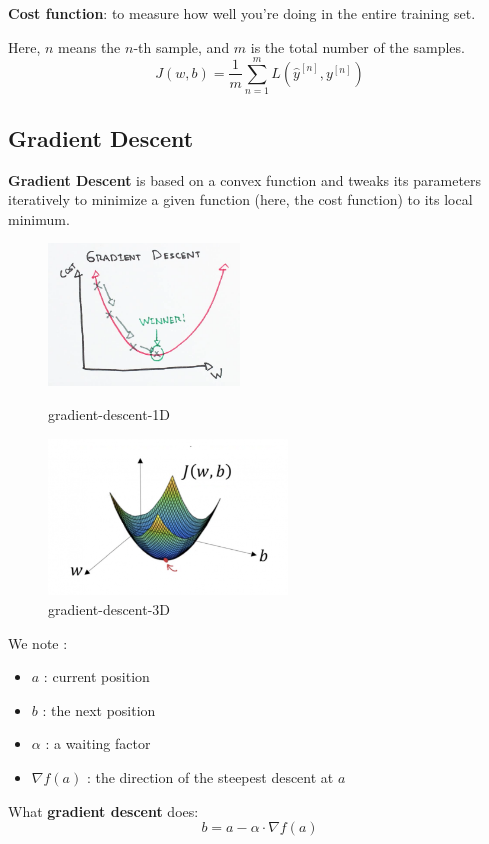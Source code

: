 \documentclass[11pt, a4paper]{article}
\begin{document}
\begin{tcolorbox}
    \textbf{Cost function}: to measure how well you're doing in the entire training set.

    Here, $n$ means the $n$-th sample, and $m$ is the total number of the samples.
    \[
        J(w,b) = \frac{1}{m} \sum_{n=1}^{m} L(\hat{y}^{[n]}, y ^{[n]})
    \]
\end{tcolorbox}

\subsection{Gradient Descent}

\textbf{Gradient Descent} is based on a convex function and tweaks its parameters iteratively to minimize a given function (here, the cost function) to its local minimum.
\begin{figure}[H]
\begin{minipage}[t]{0.5\linewidth} 
\centering 
\includegraphics[width=2.0in]{./fig/gradient-descent-1D.png} 
\caption{gradient-descent-1D} 
\label{fig:gradient-descent-1D} 
\end{minipage}%
\begin{minipage}[t]{0.5\linewidth} 
\centering 
\includegraphics[width=2.5in]{./fig/gradient-descent-3D.png} 
\caption{gradient-descent-3D} 
\label{fig:gradient-descent-3D} 
\end{minipage} 
\end{figure}

We note :
\begin{itemize}
    \item $a$ : current position
    \item $b$ : the next position
    \item $\alpha$ : a waiting factor
    \item $\nabla  f(a)$ : the direction of the steepest descent at $a$
\end{itemize}
\begin{tcolorbox}
    What \textbf{gradient descent} does:
    \[
        b = a - \alpha \cdot \nabla f(a)
    \]
\end{tcolorbox}
\end{document}
